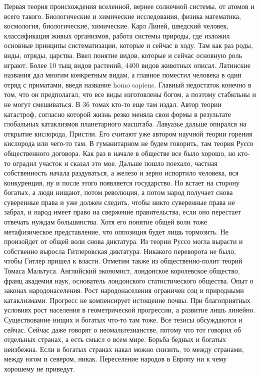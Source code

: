 \documentclass[a4paper, 12pt]{article}
\begin{document}
Первая теория происхождения вселенной, вернее солнечной системы, от 
атомов и всего такого. Биологические и химические исследования, физика 
математика, космология, биологические, химические. Карл Линей, шведский 
человек, классификация живых организмов, работа системы природы, где 
изложил основные принципы систематизации, которые и сейчас в ходу. Там 
как раз роды, виды, отряды, царства. Ввел понятие видов, которые 
и сейчас основную роль играют. Более 10 тыщ видов растений, 4400 видов 
животных описал. Латинские названия дал многим конкретным видам, 
а главное поместил человека в один отряд с приматами, введя название 
homo sapiens. Главный недостаток конечно в том, что он предполагал, что 
все виды изготовлены богом, а поэтому стабильны и не могут смешиваться. 
В 36 томах кто-то еще там издал. Автор теории катастроф, согласно 
которой жизнь резко меняла свои формы в результате глобальных 
катаклизмов планетарного масштаба. Лавуазье дальше опирался на открытие 
кислорода, Пристли. Его считают уже автором научной теории горения 
кислорода или чего-то там. В гуманитарном не будем говорить, там теория 
Руссо общественного договора. Как раз в начале в обществе все было 
хорошо, но кто-то оградил участок и сказал это мое. Дальше пошло 
поехало, частная собственность начала раздуваться, а железо и зерно 
испортило человека, вся конкуренция, ну и после этого появляется 
государство. Но встает на сторону богатых, а люди нищают, потом 
революция, а потом народ получает снова суверенные права и уже должен 
следить, чтобы никто суверенные права не забрал, и народ имеет право на 
свержение правительства, если оно перестает отвечать нуждам большинства. 
Хотя его понятие общей воли тоже метафизическое представление, что 
оппозиция будет лишь тормозить. Не произойдет от общей воли снова 
диктатура. Из теории Руссо могла вырасти и собственно выросла 
Гитлеровская диктатура. Никакого переворота не было, чтобы Гитлер пришел 
к власти. Отметим также из общественно-полит теорий Томаса Мальтуса. 
Английский экономист, лондонское королевское общество, франц академия 
наук, основатель лондонского статистического общества. Опыт о законах 
народонаселения. Рост народонаселения ограничен соц и природными 
катаклизмами. Прогресс не компенсирует истощение почвы. При 
благоприятных условиях рост населения в геометрической прогрессии, 
а развитие лишь линейно. Существование нищих и богатых что-то там тоже. 
Все тезисы обсуждаются и сейчас. Сейчас даже говорят 
о неомальтезианстве, потому что тот говорил об отдельных странах, а есть 
смысл о всем мире. Борьба бедных и богатых неизбежна. Если в богатых 
странах накал можно снизить, то между странами, между югом и севером, 
никак. Переселение народов в Европу ни к чему хорошему не приведут.
\end{document}
